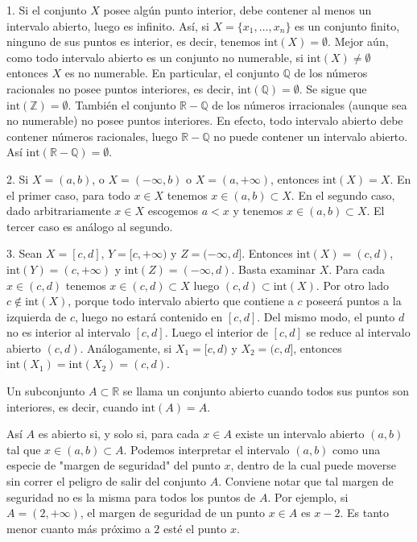 \documentclass[12pt,oneside]{book}
\begin{document}
1. Si el conjunto \(X\) posee algún punto interior, debe contener al menos un intervalo abierto, luego es infinito. Así, si \(X = \{x_1, \ldots, x_n\}\) es un conjunto finito, ninguno de sus puntos es interior, es decir, tenemos \(\text{int}(X) = \emptyset\). Mejor aún, como todo intervalo abierto es un conjunto no numerable, si \(\text{int}(X) \neq \emptyset\) entonces \(X\) es no numerable. En particular, el conjunto \(\mathbb{Q}\) de los números racionales no posee puntos interiores, es decir, \(\text{int}(\mathbb{Q}) = \emptyset\). Se sigue que \(\text{int}(\mathbb{Z}) = \emptyset\). También el conjunto \(\mathbb{R}-\mathbb{Q}\) de los números irracionales (aunque sea no numerable) no posee puntos interiores. En efecto, todo intervalo abierto debe contener números racionales, luego \(\mathbb{R}-\mathbb{Q}\) no puede contener un intervalo abierto. Así \(\text{int}(\mathbb{R}-\mathbb{Q}) = \emptyset\).

2. Si \(X = (a, b)\), o \(X = (-\infty, b)\) o \(X = (a, +\infty)\), entonces \(\text{int}(X) = X\). En el primer caso, para todo \(x \in X\) tenemos \(x \in (a, b) \subset X\). En el segundo caso, dado arbitrariamente \(x \in X\) escogemos \(a < x\) y tenemos \(x \in (a, b) \subset X\). El tercer caso es análogo al segundo.

3. Sean \(X = [c, d]\), \(Y = [c, +\infty)\) y \(Z = (-\infty, d]\). Entonces \(\text{int}(X) = (c, d)\), \(\text{int}(Y) = (c, +\infty)\) y \(\text{int}(Z) = (-\infty, d)\). Basta examinar \(X\). Para cada \(x \in (c, d)\) tenemos \(x \in (c, d) \subset X\) luego \((c, d) \subset \text{int}(X)\). Por otro lado \(c \notin \text{int}(X)\), porque todo intervalo abierto que contiene a \(c\) poseerá puntos a la izquierda de \(c\), luego no estará contenido en \([c, d]\). Del mismo modo, el punto \(d\) no es interior al intervalo \([c, d]\). Luego el interior de \([c, d]\) se reduce al intervalo abierto \((c, d)\). Análogamente, si \(X_1 = [c, d)\) y \(X_2 = (c, d]\), entonces \(\text{int}(X_1) = \text{int}(X_2) = (c, d)\).

Un subconjunto \(A \subset \mathbb{R}\) se llama un conjunto abierto cuando todos sus puntos son interiores, es decir, cuando \(\text{int}(A) = A\).

Así \(A\) es abierto si, y solo si, para cada \(x \in A\) existe un intervalo abierto \((a, b)\) tal que \(x \in (a, b) \subset A\). Podemos interpretar el intervalo \((a, b)\) como una especie de "margen de seguridad" del punto \(x\), dentro de la cual puede moverse sin correr el peligro de salir del conjunto \(A\). Conviene notar que tal margen de seguridad no es la misma para todos los puntos de \(A\). Por ejemplo, si \(A = (2, +\infty)\), el margen de seguridad de un punto \(x \in A\) es \(x - 2\). Es tanto menor cuanto más próximo a \(2\) esté el punto \(x\).
\end{document}
